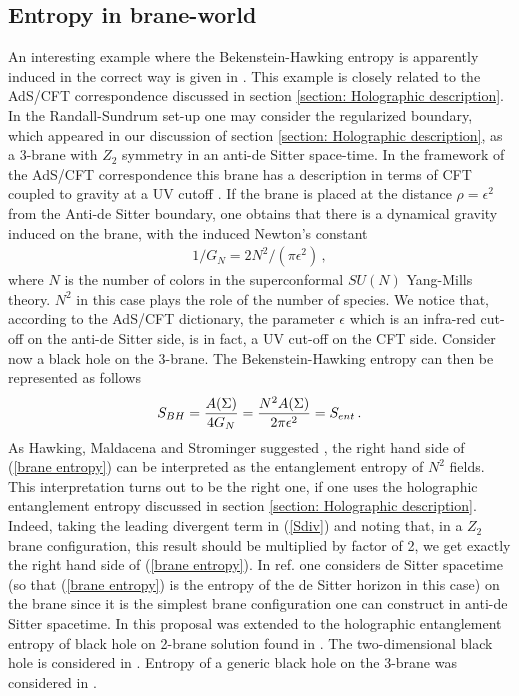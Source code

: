 \documentclass[12pt]{article}
\def\be{\begin{eqnarray}}
\def\ee{\end{eqnarray}}
\def\lb{\label}
\def\o{\over}
\begin{document}
\subsection{Entropy in brane-world}

An interesting example where the Bekenstein-Hawking entropy is apparently induced in the correct way is given in  \cite{Hawking:2000da}. This example is closely related to the AdS/CFT correspondence discussed in section \ref{section: Holographic description}.  In the Randall-Sundrum set-up \cite{Randall:1999vf} one may consider the regularized boundary, which appeared in our discussion of section \ref{section: Holographic description}, as a
3-brane with $Z_2$ symmetry in an anti-de Sitter space-time. In the framework of the
AdS/CFT correspondence this brane has a description in terms of CFT coupled to gravity at a UV cutoff \cite{Gubser:1999vj}. If the
brane is placed at the distance $\rho=\epsilon^2$ from
the Anti-de Sitter boundary, one obtains that there is a dynamical gravity
induced on the brane, with the induced Newton's constant
\be
1/G_N={2N^2/(\pi \epsilon^2)}\, ,
\lb{Randall-Sundrum}
\ee
where $N$ is the number of colors in the superconformal $SU(N)$ Yang-Mills theory. $N^2$ in this case plays the role of the number of species.  We notice that, according to the AdS/CFT dictionary, the parameter $\epsilon$ which is an infra-red cut-off on the anti-de Sitter side, is in fact, a UV cut-off on the CFT side.
Consider now a black hole on the 3-brane. The Bekenstein-Hawking entropy  can then be represented as follows
\be
S_{BH}={A(\Sigma)\o 4G_N}={N^2 A(\Sigma)\o 2\pi \epsilon^2}=S_{ent}\, .
\lb{brane entropy}
\ee
As  Hawking, Maldacena and Strominger  \cite{Hawking:2000da} suggested , the right hand side of (\ref{brane entropy}) can be interpreted as the entanglement entropy of $N^2$ fields. This interpretation
turns out to be the right one, if one uses the holographic entanglement entropy discussed in section \ref{section: Holographic description}. Indeed, taking the leading divergent term in (\ref{Sdiv})  and noting that, in a $Z_2$ brane configuration, this result should be multiplied by factor of 2, we get exactly the right hand side of (\ref{brane entropy}). In ref.\cite{Hawking:2000da} one considers
 de Sitter spacetime (so that (\ref{brane entropy}) is the entropy of the de Sitter horizon in this case)  on the brane since it is the simplest brane configuration one can construct in anti-de Sitter spacetime. In \cite{Emparan:2006ni}  this proposal was extended to the holographic entanglement entropy of black hole on 2-brane solution found in \cite{Emparan:1999wa}.
 The two-dimensional black hole is considered in \cite{Fursaev:2000ym}.
 Entropy of a generic black hole on the 3-brane was considered in \cite{Solodukhin:2006xv}.
 
\end{document}
